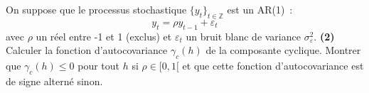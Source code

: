 \documentclass[10pt,a4paper,notitlepage,twocolumn]{article}
\newcommand{\question}[1]{\textbf{(#1)}}
\begin{document}
On suppose que le processus
stochastique $\{y_t\}_{t\in\mathbb Z}$ est un AR(1)~:
\[
y_t = \rho y_{t-1} + \varepsilon_t
\]
avec $\rho$ un réel entre -1 et 1 (exclus) et $\varepsilon_t$ un bruit blanc de variance $\sigma_{\varepsilon}^2$.
\question{2} Calculer la fonction d'autocovariance $\gamma_c(h)$ de la
composante cyclique. Montrer que $\gamma_c(h)\leq 0$ pour tout $h$ si
$\rho\in[0,1[$ et que cette fonction d'autocovariance est de signe
alterné sinon.
\end{document}
